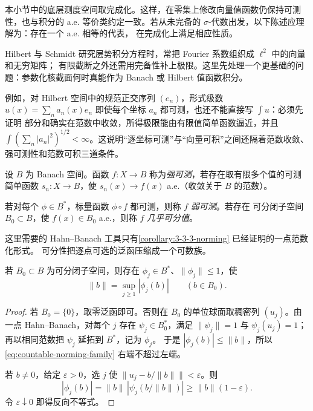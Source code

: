 本小节中的底层测度空间取完成化。这样，在零集上修改向量值函数仍保持可测性，也与积分的 a.e.
等价类约定一致。若从未完备的 $\sigma$-代数出发，以下陈述应理解为：存在一个 a.e. 相等的代表，
在完成化上满足相应性质。

Hilbert 与 Schmidt 研究层势积分方程时，常把 Fourier 系数组织成 $\ell^2$ 中的向量和无穷矩阵；
有限截断之外还需用完备性补上极限。这里先处理一个更基础的问题：参数化核截面何时真能作为
Banach 或 Hilbert 值函数积分。

例如，对 Hilbert 空间中的规范正交序列 $(e_n)$，形式级数
$u(x)=\sum_na_n(x)e_n$ 即使每个坐标 $a_n$ 都可测，也还不能直接写 $\int u$：必须先证明
部分和确实在范数中收敛，所得极限能由有限值简单函数逼近，并且
$\int(\sum_n|a_n|^2)^{1/2}<\infty$。这说明“逐坐标可测”与“向量可积”之间还隔着范数收敛、
强可测性和范数可积三道条件。

\begin{definition}[强可测]\label{def:3-4-2-1}
设 $B$ 为 Banach 空间。函数 $f:X\to B$ 称为\emph{强可测}，若存在取有限多个值的可测简单函数
$s_n:X\to B$，使 $s_n(x)\to f(x)$ a.e.（收敛关于 $B$ 的范数）。
\end{definition}

\begin{definition}[弱可测与几乎可分值]\label{def:3-4-2-2}
若对每个 $\phi\in B^*$，标量函数 $\phi\circ f$ 都可测，则称 $f$ \emph{弱可测}。若存在
可分闭子空间 $B_0\subset B$，使 $f(x)\in B_0$ a.e.，则称 $f$ \emph{几乎可分值}。
\end{definition}

这里需要的 Hahn--Banach 工具只有\cref{corollary:3-3-3-norming} 已经证明的一点范数化形式。
可分性把逐点可选的泛函压缩成一个可数族。

\begin{lemma}[可分子空间的可数范数化族]\label{lemma:3-4-2-1}
若 $B_0\subset B$ 为可分闭子空间，则存在 $\phi_j\in B^*$、$\|\phi_j\|\le1$，使
\[
  \|b\|=\sup_{j\ge1}|\phi_j(b)|\qquad(b\in B_0).
  \tag{3.4.8}\label{eq:countable-norming-family}
\]
\end{lemma}

\begin{proof}
若 $B_0=\{0\}$，取零泛函即可。否则在 $B_0$ 的单位球面取稠密列 $(u_j)$。由一点
Hahn--Banach，对每个 $j$ 存在 $\psi_j\in B_0^*$，满足
$\|\psi_j\|=1$ 与 $\psi_j(u_j)=1$；再以相同范数把 $\psi_j$ 延拓到 $B^*$，记为 $\phi_j$。
于是 $|\phi_j(b)|\le\|b\|$，所以 \eqref{eq:countable-norming-family} 右端不超过左端。

若 $b\ne0$，给定 $\varepsilon>0$，选 $j$ 使
$\|u_j-b/\|b\|\|<\varepsilon$。则
\[
 |\phi_j(b)|
 =\|b\|\,|\psi_j(b/\|b\|)|
 \ge\|b\|(1-\varepsilon).
\]
令 $\varepsilon\downarrow0$ 即得反向不等式。
\end{proof}


